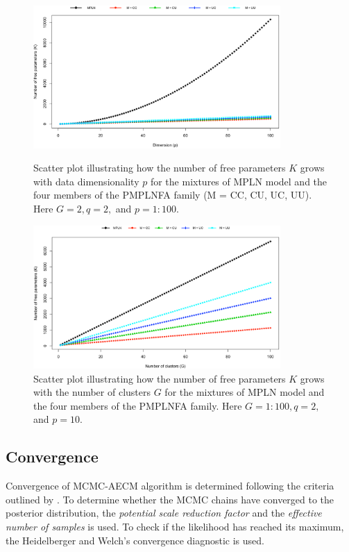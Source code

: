 \documentclass[12pt]{article}
\begin{document}
\begin{figure}[h!]
\centering
\includegraphics[width=0.84\textwidth]{Chap4_Numb_fparameters_d=1-100,q=2,G=2.png}
\caption{Scatter plot illustrating how the number of free parameters $K$ grows with data dimensionality $p$ for the mixtures of MPLN model and the four members of the PMPLNFA family (M = CC, CU, UC, UU). Here $G = 2, q = 2,$ and $p = 1:100$.} 
\label{freepara1_FAMPLN}
\includegraphics[width=0.84\textwidth]{Chap4_Numb_fparameters_d=10,q=2,G=1-100.png}
\caption{Scatter plot illustrating how the number of free parameters $K$ grows with the number of clusters $G$ for the mixtures of MPLN model and the four members of the PMPLNFA family. Here $G = 1:100, q = 2,$ and $p = 10$.} 
\label{freepara2_FAMPLN}
\end{figure}

\subsection{Convergence}
Convergence of MCMC-AECM algorithm is determined following the criteria outlined by \citet{Silva2017}. To determine whether the MCMC chains have converged to the posterior distribution, the \textit{potential scale reduction factor} \citep{gelman1992} and the \textit{effective number of samples} \citep{gelman2013} is used. To check if the likelihood has reached its maximum, the Heidelberger and Welch's convergence diagnostic \citep{heidelberger1983} is used.
\end{document}

